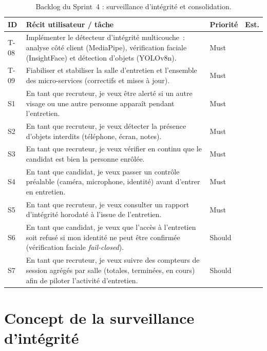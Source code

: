 \begin{table}[H]
  \centering
  \footnotesize
  \renewcommand{\arraystretch}{1.3}
  \setlength{\tabcolsep}{5pt}
  \begin{tabularx}{\textwidth}{|>{\centering\arraybackslash}p{1.1cm}|>{\raggedright\arraybackslash}X|>{\centering\arraybackslash}p{1.7cm}|>{\centering\arraybackslash}p{0.9cm}|}
    \hline
    \rowcolor{blue!10}
    \textbf{ID} & \textbf{Récit utilisateur / tâche} & \textbf{Priorité} & \textbf{Est.} \\
    \hline
    T-08 & Implémenter le détecteur d'intégrité multicouche~: analyse côté client (MediaPipe), vérification faciale (InsightFace) et détection d'objets (YOLOv8n). & Must & 13 \\
    \hline
    T-09 & Fiabiliser et stabiliser la salle d'entretien et l'ensemble des micro-services (correctifs et mises à jour). & Must & 5 \\
    \hline
    S1 & En tant que recruteur, je veux être alerté si un autre visage ou une autre personne apparaît pendant l'entretien. & Must & 5 \\
    \hline
    S2 & En tant que recruteur, je veux détecter la présence d'objets interdits (téléphone, écran, notes). & Must & 5 \\
    \hline
    S3 & En tant que recruteur, je veux vérifier en continu que le candidat est bien la personne enrôlée. & Must & 8 \\
    \hline
    S4 & En tant que candidat, je veux passer un contrôle préalable (caméra, microphone, identité) avant d'entrer en entretien. & Must & 5 \\
    \hline
    S5 & En tant que recruteur, je veux consulter un rapport d'intégrité horodaté à l'issue de l'entretien. & Must & 5 \\
    \hline
    S6 & En tant que candidat, je veux que l'accès à l'entretien soit refusé si mon identité ne peut être confirmée (vérification faciale \textit{fail-closed}). & Should & 3 \\
    \hline
    S7 & En tant que recruteur, je veux suivre des compteurs de session agrégés par salle (totales, terminées, en cours) afin de piloter l'activité d'entretien. & Should & 2 \\
    \hline
  \end{tabularx}
  \caption{Backlog du Sprint~4 : surveillance d'intégrité et consolidation.}
  \label{tab:backlog-s4}
\end{table}

\section{Concept de la surveillance d'intégrité}

